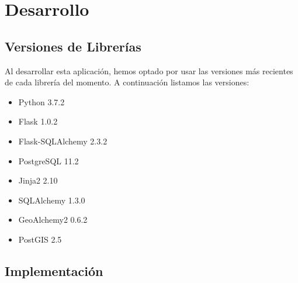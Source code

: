 \chapter{Desarrollo\label{CAP:DESARROLLO}}
  \section{Versiones de Librerías}
    Al desarrollar esta aplicación, hemos optado por usar las versiones más recientes de cada librería del momento. A continuación listamos las versiones:
    \begin{itemize}
      \item Python 3.7.2
      \item Flask 1.0.2
      \item Flask-SQLAlchemy 2.3.2
      \item PostgreSQL 11.2
      \item Jinja2 2.10
      \item SQLAlchemy 1.3.0 
      \item GeoAlchemy2 0.6.2
      \item PostGIS 2.5
    \end{itemize}
  \section{Implementación}
  